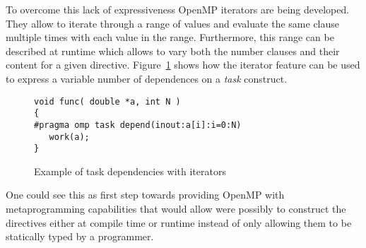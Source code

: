 To overcome this lack of expressiveness OpenMP iterators are being developed.
They allow to iterate through a range of values and evaluate the same clause
multiple times with each value in the range. Furthermore, this range can be
described at runtime which allows to vary both the number clauses and their
content for a given directive. Figure~\ref{fig:iterators} shows how the iterator
feature can be used to express a variable number of dependences on a \emph{task}
construct.

\begin{figure}
\begin{verbatim}
void func( double *a, int N )
{
#pragma omp task depend(inout:a[i]:i=0:N)
   work(a);
}
\end{verbatim}
\caption{Example of task dependencies with iterators}
\label{fig:iterators}
\end{figure}
   
One could see this as first step towards providing OpenMP with metaprogramming
capabilities that would allow were possibly to construct the directives either
at compile time or runtime instead of only allowing them to be statically typed
by a programmer.
   

